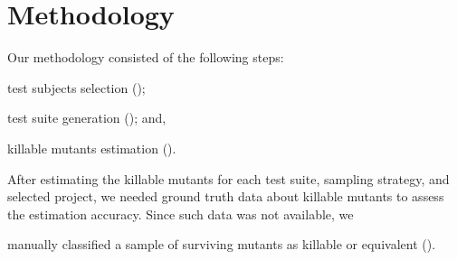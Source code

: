 \documentclass[sigconf]{acmart}
\begin{document}
\section{Methodology}

Our methodology consisted of the following steps:
\begin{enumerate*}[label=(\arabic*)]
    \item test subjects selection ();
    \item test suite generation ();
    and, \item killable mutants estimation ().
\end{enumerate*}
After estimating the killable mutants for each test suite, sampling strategy, and selected project,
we needed ground truth data about killable mutants
to assess the estimation accuracy. %
Since such data was not available, %
we 
\begin{enumerate*}[label=(\arabic*),start=4]   
     \item manually classified a sample of surviving mutants as killable or equivalent ().
\end{enumerate*}
\end{document}
